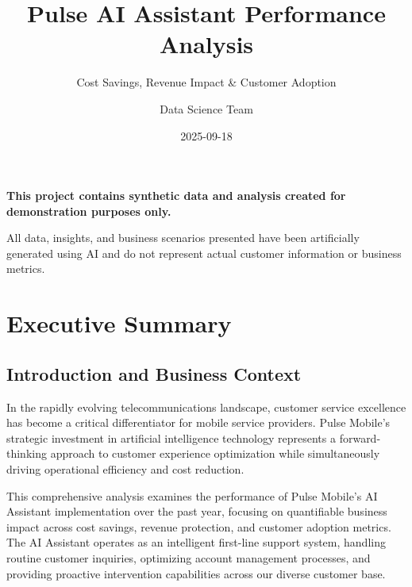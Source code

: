 \documentclass[
  letterpaper,
  DIV=11,
  numbers=noendperiod]{scrartcl}
\title{Pulse AI Assistant Performance Analysis}
\subtitle{Cost Savings, Revenue Impact \& Customer Adoption}
\author{Data Science Team}
\date{2025-09-18}
\begin{document}
\maketitle


\begin{tcolorbox}[enhanced jigsaw, left=2mm, leftrule=.75mm, opacitybacktitle=0.6, toprule=.15mm, colframe=quarto-callout-important-color-frame, colbacktitle=quarto-callout-important-color!10!white, coltitle=black, rightrule=.15mm, breakable, bottomtitle=1mm, toptitle=1mm, bottomrule=.15mm, titlerule=0mm, arc=.35mm, title=\textcolor{quarto-callout-important-color}{\faExclamation}\hspace{0.5em}{Important Disclaimer}, opacityback=0, colback=white]

\textbf{This project contains synthetic data and analysis created for
demonstration purposes only.}

All data, insights, and business scenarios presented have been
artificially generated using AI and do not represent actual customer
information or business metrics.

\end{tcolorbox}

\section{Executive Summary}\label{executive-summary}

\subsection{Introduction and Business
Context}\label{introduction-and-business-context}

In the rapidly evolving telecommunications landscape, customer service
excellence has become a critical differentiator for mobile service
providers. Pulse Mobile's strategic investment in artificial
intelligence technology represents a forward-thinking approach to
customer experience optimization while simultaneously driving
operational efficiency and cost reduction.

This comprehensive analysis examines the performance of Pulse Mobile's
AI Assistant implementation over the past year, focusing on quantifiable
business impact across cost savings, revenue protection, and customer
adoption metrics. The AI Assistant operates as an intelligent first-line
support system, handling routine customer inquiries, optimizing account
management processes, and providing proactive intervention capabilities
across our diverse customer base.
\end{document}
